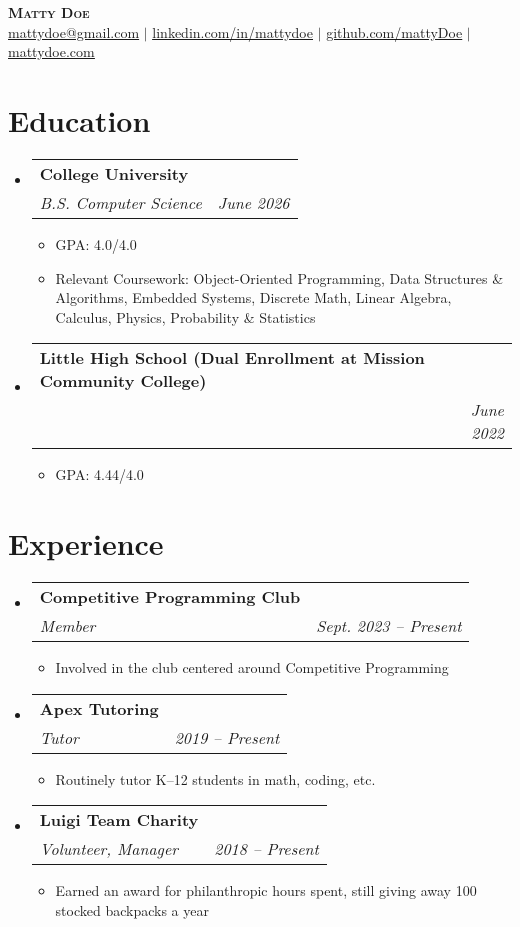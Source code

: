 \documentclass[letterpaper,11pt]{article}
\makeatletter
\newcommand{\resumeItem}[1]{
  \item\small{
    {#1 \vspace{-2pt}}
  }
}
\newcommand{\resumeSubheading}[4]{
  \vspace{-2pt}\item
    \begin{tabular*}{0.97\textwidth}[t]{l@{\extracolsep{\fill}}r}
      \textbf{#1} & #2 \\
      \textit{\small#3} & \textit{\small #4} \\
    \end{tabular*}\vspace{-7pt}
}
\newcommand{\resumeSubHeadingListStart}{\begin{itemize}[leftmargin=0.15in, label={}]}
\newcommand{\resumeSubHeadingListEnd}{\end{itemize}}
\newcommand{\resumeItemListStart}{\begin{itemize}}
\newcommand{\resumeItemListEnd}{\end{itemize}\vspace{-5pt}}
\makeatother
\begin{document}
\begin{center}
    \textbf{\Huge \scshape Matty Doe} \\ \vspace{1pt}
    \small \href{mailto:mattydoe@gmail.com}{\underline{mattydoe@gmail.com}} $|$
    \href{https://linkedin.com/in/mattydoe}{\underline{linkedin.com/in/mattydoe}} $|$
    \href{https://github.com/mattyDoe}{\underline{github.com/mattyDoe}} $|$
    \href{https://mattydoe.com}{\underline{mattydoe.com}}
\end{center}


\section{Education}
  \resumeSubHeadingListStart
    \resumeSubheading
      {College University}{ }
      {B.S. Computer Science}{June 2026}
      \resumeItemListStart
        \resumeItem{GPA: 4.0/4.0}
        \resumeItem{Relevant Coursework: Object-Oriented Programming, Data Structures \& Algorithms, Embedded Systems, Discrete Math, Linear Algebra, Calculus, Physics, Probability \& Statistics}
      \resumeItemListEnd
    \resumeSubheading
      {Little High School (Dual Enrollment at Mission Community College)}{ }
      {}{June 2022}
      \resumeItemListStart
        \resumeItem{GPA: 4.44/4.0}
      \resumeItemListEnd
  \resumeSubHeadingListEnd


\section{Experience}
  \resumeSubHeadingListStart
    \resumeSubheading
      {Competitive Programming Club}{ }
      {Member}{Sept. 2023 -- Present}
      \resumeItemListStart
        \resumeItem{Involved in the club centered around Competitive Programming}
      \resumeItemListEnd
    \resumeSubheading
      {Apex Tutoring}{ }
      {Tutor}{2019 -- Present}
      \resumeItemListStart
        \resumeItem{Routinely tutor K--12 students in math, coding, etc.}
      \resumeItemListEnd
    \resumeSubheading
      {Luigi Team Charity}{ }
      {Volunteer, Manager}{2018 -- Present}
      \resumeItemListStart
        \resumeItem{Earned an award for philanthropic hours spent, still giving away 100 stocked backpacks a year}
      \resumeItemListEnd
  \resumeSubHeadingListEnd


\end{document}
